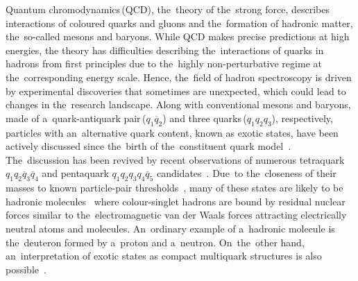 \documentclass[12pt,a4paper]{article}
\def\Pq      {\ensuremath{\mathrm{q}}\xspace}
\def\Pq      {\ensuremath{q}\xspace}
\def\quark     {{\ensuremath{\Pq}}\xspace}
\def\quarkbar  {{\ensuremath{\overline \quark}}\xspace}
\begin{document}
Quantum chromodynamics\,(QCD), 
the~theory of the~strong force, 
describes 
interactions of coloured quarks and gluons
and the~formation of hadronic matter, 
the~so-called mesons and baryons. 
While QCD makes precise 
predictions at high energies, 
the theory has difficulties
describing 
the~interactions of  quarks
in hadrons 
from first principles 
due to the~highly 
non\nobreakdash-perturbative 
regime at the~corresponding energy scale.
Hence, the~field of hadron spectroscopy is
driven by
experimental discoveries
that sometimes are unexpected, 
which could lead to changes 
in the~research landscape. 
Along with 
conventional mesons and baryons, 
made of 
a~quark-antiquark 
pair\,(\mbox{$\quark_1\quarkbar_2$})
and  three 
quarks\,(\mbox{$\quark_1\quark_2\quark_3$}),
respectively, 
particles with 
an~alternative quark content,
known as exotic states, 
have been actively discussed 
since the~birth of the~constituent quark 
model~\cite{GellMann:1964nj,
Zweig:352337,Zweig:570209, 
Jaffe:1976ig,
Jaffe:1976ih,
Rossi:1977cy,
Jaffe:1977cv, 
Lipkin:1987sk}.
The~discussion has been revived 
by recent observations of 
numerous 
tetraquark $\quark_1\quark_2\quarkbar_3\quarkbar_4$ 
and pentaquark 
$\quark_1\quark_2\quark_3\quark_4\quarkbar_5$ 
candidates~\cite{
Choi:2003ue,
 Choi:2007wga,
 Belle:2008qeq,
  Aaltonen:2009tz,
 Belle:2011aa, 
  Ablikim:2013mio,
  BESIII:2013ouc,
  BESIII:2013mhi,
  Abazov:2013xda,
  Chatrchyan:2013dma,
   Chilikin:2013tch,
   Belle:2013yex, Chilikin:2014bkk, 
  LHCb-PAPER-2014-014,
   LHCb-PAPER-2015-029, 
  LHCb-PAPER-2015-038,
LHCb-PAPER-2016-018, 
  LHCb-PAPER-2016-019, 
  LHCb-PAPER-2018-034,
  LHCb-PAPER-2019-014,
LHCb-PAPER-2020-011, 
  LHCb-PAPER-2020-024,
  LHCb-PAPER-2020-025, 
LHCb-PAPER-2020-035,
  LHCb-PAPER-2020-039,
  LHCb-PAPER-2020-044,
Ablikim_2021,
LHCb-PAPER-2021-018}. Due~to the~closeness of their masses 
to known particle\nobreakdash-pair 
thresholds~\cite{
Brambilla:2019esw,
PDG2021}, 
many of these 
states are likely to be 
hadronic molecules~\cite{Oset:2019upy,
Richard_2016,Guo:2017jvc, 
MartinezTorres:2020hus}
where colour\nobreakdash-singlet hadrons are bound by 
residual nuclear forces
similar to the~electromagnetic 
van der Waals 
forces attracting 
electrically neutral atoms and molecules.
An~ordinary 
example of 
a~hadronic molecule is the~deuteron 
formed by a~proton and a~neutron.
On~the~other hand, an~interpretation of exotic states
as compact multiquark structures 
is also possible~\cite{Ali:2019roi}.
\end{document}

